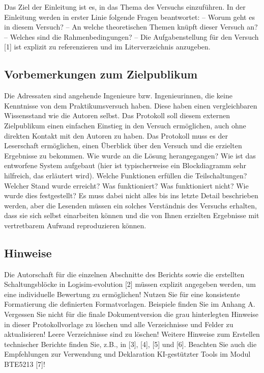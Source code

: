 Das Ziel der Einleitung ist es, in das Thema des Versuchs einzuführen. In der Einleitung werden in erster Linie folgende Fragen beantwortet:
–	Worum geht es in diesem Versuch?
–	An welche theoretischen Themen knüpft dieser Versuch an?
–	Welches sind die Rahmenbedingungen? 
–	Die Aufgabenstellung für den Versuch [1] ist explizit zu referenzieren und im Literverzeichnis anzugeben.

\subsection{Vorbemerkungen zum Zielpublikum}
Die Adressaten sind angehende Ingenieure bzw. Ingenieurinnen, die keine Kenntnisse von dem Praktikumsversuch haben. Diese haben einen vergleichbaren Wissensstand wie die Autoren selbst. Das Protokoll soll diesem externen Zielpublikum einen einfachen Einstieg in den Versuch ermöglichen, auch ohne direkten Kontakt mit den Autoren zu haben.
Das Protokoll muss es der Leserschaft ermöglichen, einen Überblick über den Versuch und die erzielten Ergebnisse zu bekommen. Wie wurde an die Lösung herangegangen? Wie ist das entworfene System aufgebaut (hier ist typischerweise ein Blockdiagramm sehr hilfreich, das erläutert wird). Welche Funktionen erfüllen die Teilschaltungen? Welcher Stand wurde erreicht? Was funktioniert? Was funktioniert nicht? Wie wurde dies festgestellt?
Es muss dabei nicht alles bis ins letzte Detail beschrieben werden, aber die Lesenden müssen ein solches Verständnis des Versuchs erhalten, dass sie sich selbst einarbeiten können und die von Ihnen erzielten Ergebnisse mit vertretbarem Aufwand reproduzieren können.

\subsection{Hinweise}
Die Autorschaft für die einzelnen Abschnitte des Berichts sowie die erstellten Schaltungsblöcke in Logisim-evolution [2] müssen explizit angegeben werden, um eine individuelle Bewertung zu ermöglichen!
Nutzen Sie für eine konsistente Formatierung die definierten Formatvorlagen. Beispiele finden Sie im Anhang A. Vergessen Sie nicht für die finale Dokumentversion die grau hinterlegten Hinweise in dieser Protokollvorlage zu löschen und alle Verzeichnisse und Felder zu aktualisieren! Leere Verzeichnisse sind zu löschen!
Weitere Hinweise zum Erstellen technischer Berichte finden Sie, z.B., in [3], [4], [5] und [6]. Beachten Sie auch die Empfehlungen zur Verwendung und Deklaration KI-gestützter Tools im Modul BTE5213 [7]!